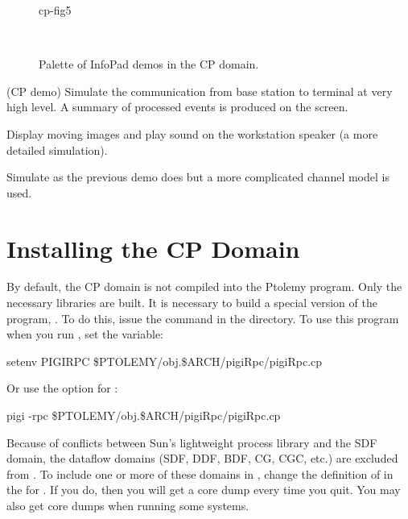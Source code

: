 \begin{figure}
\begin{gif}{cp-fig5}
\begin{center}
\ 
\end{center}
\caption{Palette of InfoPad demos in the CP domain.}
\label{figure CP infopad demos}
\end{gif}
\end{figure}

\begin{indexlist}{ (CP demo)}
Simulate the communication from base station to terminal at very high level.
A summary of processed events is produced on the screen.

Display moving images and play sound on the workstation speaker
(a more detailed simulation).

Simulate as the previous demo does but a more complicated channel
model is used.

\end{indexlist}

\section{Installing the CP Domain}
\label{Installing the CP Domain}

By default, the CP domain is not compiled into the Ptolemy
 program.  Only the necessary libraries
are built.  It is necessary to build a special version of the program,
.  To do this, issue the command  in the  directory.  To use this
program when you run , set the  variable:
\begin{example}
setenv PIGIRPC \$PTOLEMY/obj.\$ARCH/pigiRpc/pigiRpc.cp
\end{example}
Or use the  option for :
\begin{example}
pigi -rpc \$PTOLEMY/obj.\$ARCH/pigiRpc/pigiRpc.cp
\end{example}

Because of conflicts between Sun's lightweight process library and the
SDF domain, the dataflow domains (SDF, DDF, BDF, CG, CGC, etc.) are
excluded from .  To include one or more of these
domains in , change the definition of
 in the  for .
If you do, then you will get a core dump every time you
quit.  You may also get core dumps when running some systems.

\begin{ifhtml}

\end{ifhtml}
